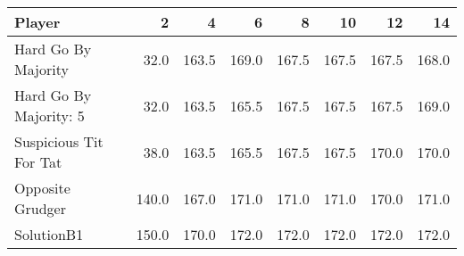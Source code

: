 \begin{tabular}{lrrrrrrr}
\toprule
                 Player &      2 &      4 &      6 &      8 &     10 &     12 &     14 \\
\midrule
    Hard Go By Majority &   32.0 &  163.5 &  169.0 &  167.5 &  167.5 &  167.5 &  168.0 \\
 Hard Go By Majority: 5 &   32.0 &  163.5 &  165.5 &  167.5 &  167.5 &  167.5 &  169.0 \\
 Suspicious Tit For Tat &   38.0 &  163.5 &  165.5 &  167.5 &  167.5 &  170.0 &  170.0 \\
       Opposite Grudger &  140.0 &  167.0 &  171.0 &  171.0 &  171.0 &  170.0 &  171.0 \\
             SolutionB1 &  150.0 &  170.0 &  172.0 &  172.0 &  172.0 &  172.0 &  172.0 \\
\bottomrule
\end{tabular}
